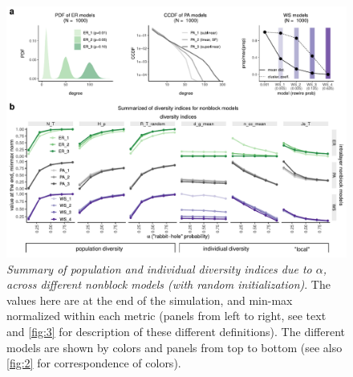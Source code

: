 \begin{figure}[!ht]
    \centering
    \includegraphics[width=\textwidth]{figures/FigS1.pdf}
    \caption{\label{fig:4}
    \textit{Summary of population and individual diversity indices due to $\alpha$, across different nonblock models (with random initialization)}. The values here are at the end of the simulation, and min-max normalized within each metric (panels from left to right, see text and \ref{fig:3} for description of these different definitions). The different models are shown by colors and panels from top to bottom (see also \ref{fig:2} for correspondence of colors).
    }
\end{figure}